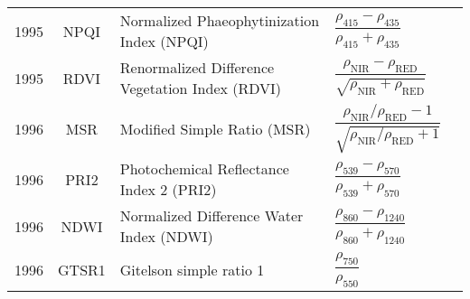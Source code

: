 \documentclass[10pt]{article}
\begin{document}
\begin{ThreePartTable}
\begin{longtable}{c c m{2.80in} M{2.80in} M{1.5in}}
  1995 & NPQI    & Normalized Phaeophytinization Index (NPQI)                                     & $\dfrac{\rho_{415}-\rho_{435}}{\rho_{415}+\rho_{435}}$                                                                                                                                                                                                                                  & \citet{Penuelas1995b}                               \\
  1995 & RDVI    & Renormalized Difference Vegetation Index (RDVI)                                & $\dfrac{\rho_\text{NIR}-\rho_\text{RED}}{\sqrt{\rho_\text{NIR}+\rho_\text{RED}}}$                                                                                                                                                                                                       & \citet{Roujean1995}                                 \\
  1996 & MSR     & Modified Simple Ratio (MSR)                                                    & $\dfrac{\rho_\text{NIR}/\rho_\text{RED}-1}{\sqrt{\rho_\text{NIR}/\rho_\text{RED}+1}}$                                                                                                                                                                                                   & \citet{Chen1996,Roujean1995}                        \\
  1996 & PRI2    & Photochemical Reflectance Index 2 (PRI2)                                       & $\dfrac{\rho_{539}-\rho_{570}}{\rho_{539}+\rho_{570}}$                                                                                                                                                                                                                                  & \citet{Filella1996}                                 \\
  1996 & NDWI    & Normalized Difference Water Index (NDWI)                                       & $\dfrac{\rho_{860}-\rho_{1240}}{\rho_{860}+\rho_{1240}}$                                                                                                                                                                                                                                & \citet{Gao1996}                                     \\
  1996 & GTSR1   & Gitelson simple ratio 1                                                        & $\dfrac{\rho_{750}}{\rho_{550}}$                                                                                                                                                                                                                                                        & \citet{Gitelson1996b,Gitelson1997,Lichtenthaler1996}\\

\end{longtable}
\end{ThreePartTable}
\end{document}
